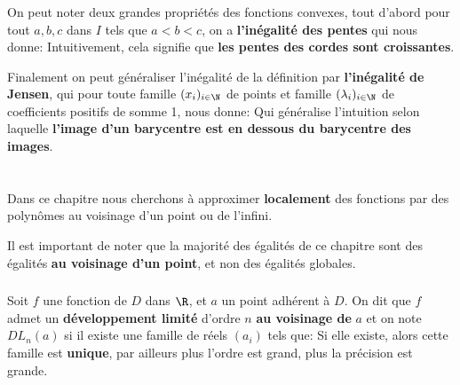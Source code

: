 \subsection*{}

On peut noter deux grandes propriétés des fonctions convexes, tout d'abord pour tout \(a, b, c\) dans \(I\) tels que \(a < b < c\), on a \textbf{l'inégalité des pentes} qui nous donne:
Intuitivement, cela signifie que \textbf{les pentes des cordes sont croissantes}.\<

Finalement on peut généraliser l'inégalité de la définition par \textbf{l'inégalité de Jensen}, qui pour toute famille \((x_i)_{i \in \N}\) de points et famille \((\lambda_i)_{i \in \N}\) de coefficients positifs de somme 1, nous donne:
Qui généralise l'intuition selon laquelle \textbf{l'image d'un barycentre est en dessous du barycentre des images}.

\chapter*{} %

Dans ce chapitre nous cherchons à approximer \textbf{localement} des fonctions par des polynômes au voisinage d'un point ou de l'infini.\<

Il est important de noter que la majorité des égalités de ce chapitre sont des égalités \textbf{au voisinage d'un point}, et non des égalités globales.
\subsection*{}

Soit \(f\) une fonction de \(D\) dans \(\R\), et \(a\) un point adhérent à \(D\). On dit que \(f\) admet un \textbf{développement limité} d'ordre \(n\) \textbf{au voisinage de } \(a\) et on note \(DL_n(a)\) si il existe une famille de réels \((a_i)\) tels que:
Si elle existe, alors cette famille est \textbf{unique}, par ailleurs plus l'ordre est grand, plus la précision est grande.\+

